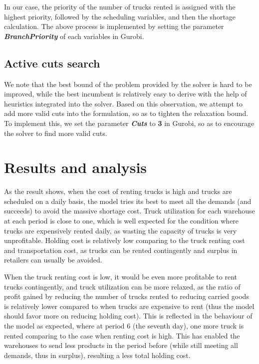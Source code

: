 \documentclass[a4paper,12pt]{article}
\begin{document}
In our case, the priority of the number of trucks rented is assigned with the highest priority, followed by the scheduling variables, and then the shortage calculation. The above process is implemented by setting the parameter \textbf{\textit{BranchPriority}} of each variables in Gurobi.

\subsection{Active cuts search}
We note that the best bound of the problem provided by the solver
is hard to be improved, while the best incumbent is relatively easy to derive with the help of heuristics integrated into the solver. Based on this observation, we attempt to add more valid cuts into the formulation, so as to tighten the relaxation bound. To implement this, we set the parameter \textbf{\textit{Cuts}} to \textbf{3} in Gurobi, so as to encourage the solver to find more valid cuts.











\section{Results and analysis}\label{sec:results-and-analysis}

As the result shows, when the cost of renting trucks is high and trucks are scheduled on a daily basis, the model tries its best to meet all the demands (and succeeds) to avoid the massive shortage cost. Truck utilization for each warehouse at each period is close to one, which is well expected for the condition where trucks are expensively rented daily, as wasting the capacity of trucks is very unprofitable. Holding cost is relatively low comparing to the truck renting cost and transportation cost, as trucks can be rented contingently and surplus in retailers can usually be avoided.

When the truck renting cost is low, it would be even more profitable to rent trucks contingently, and truck utilization can be more relaxed, as the ratio of profit gained by reducing the number of trucks rented to reducing carried goods is relatively lower compared to when trucks are expensive to rent (thus the model should favor more on reducing holding cost). This is reflected in the behaviour of the model as expected, where at period 6 (the seventh day), one more truck is rented comparing to the case when renting cost is high. This has enabled the warehouses to send less products in the period before (while still meeting all demands, thus in surplus), resulting a less total holding cost.
\end{document}
